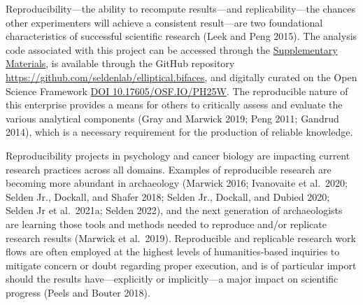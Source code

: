 \documentclass[]{interact}
\theoremstyle{plain}%
\theoremstyle{definition}
\theoremstyle{remark}
\begin{document}
Reproducibility---the ability to recompute results---and
replicability---the chances other experimenters will achieve a
consistent result---are two foundational characteristics of successful
scientific research (Leek and Peng 2015). The analysis code associated
with this project can be accessed through the
\href{https://seldenlab.github.io/elliptical.bifaces/}{Supplementary
Materials}, is available through the GitHub repository
\url{https://github.com/seldenlab/elliptical.bifaces}, and digitally
curated on the Open Science Framework \href{https://osf.io/ph25w/}{DOI
10.17605/OSF.IO/PH25W}. The reproducible nature of this enterprise
provides a means for others to critically assess and evaluate the
various analytical components (Gray and Marwick 2019; Peng 2011; Gandrud
2014), which is a necessary requirement for the production of reliable
knowledge.

Reproducibility projects in psychology and cancer biology are impacting
current research practices across all domains. Examples of reproducible
research are becoming more abundant in archaeology (Marwick 2016;
Ivanovaite et al.~2020; Selden Jr., Dockall, and Shafer 2018; Selden
Jr., Dockall, and Dubied 2020; Selden Jr et al.~2021a; Selden 2022), and
the next generation of archaeologists are learning those tools and
methods needed to reproduce and/or replicate research results (Marwick
et al.~2019). Reproducible and replicable research work flows are often
employed at the highest levels of humanities-based inquiries to mitigate
concern or doubt regarding proper execution, and is of particular import
should the results have---explicitly or implicitly---a major impact on
scientific progress (Peels and Bouter 2018).






\end{document}
